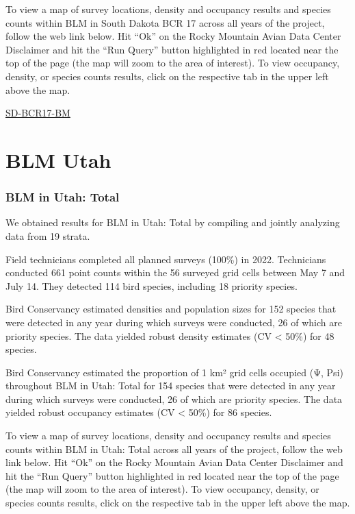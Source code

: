 \documentclass[
  letterpaper,
  DIV=11,
  numbers=noendperiod,
  oneside]{scrreprt}
\begin{document}
To view a map of survey locations, density and occupancy results and
species counts within BLM in South Dakota BCR 17 across all years of the
project, follow the web link below. Hit ``Ok'' on the Rocky Mountain
Avian Data Center Disclaimer and hit the ``Run Query'' button
highlighted in red located near the top of the page (the map will zoom
to the area of interest). To view occupancy, density, or species counts
results, click on the respective tab in the upper left above the map.

\href{http://www.rmbo.org/new_site/adc/QueryWindow.aspx\#N4IgzgLgTghhCuBbEAuABCAygEQLQCEBhAJQEYB2AgWXX3igFMZ40B7AMzQBkYA7AEzRU+MAOYNEDXhBABfIA===}{SD-BCR17-BM}

\hypertarget{blm-utah}{%
\section{BLM Utah}\label{blm-utah}}

\hypertarget{blm-in-utah-total}{%
\subsubsection{BLM in Utah: Total}\label{blm-in-utah-total}}

We obtained results for BLM in Utah: Total by compiling and jointly
analyzing data from 19 strata.

Field technicians completed all planned surveys (100\%) in 2022.
Technicians conducted 661 point counts within the 56 surveyed grid cells
between May 7 and July 14. They detected 114 bird species, including 18
priority species.

Bird Conservancy estimated densities and population sizes for 152
species that were detected in any year during which surveys were
conducted, 26 of which are priority species. The data yielded robust
density estimates (CV \textless{} 50\%) for 48 species.

Bird Conservancy estimated the proportion of 1 km² grid cells occupied
(Ψ, Psi) throughout BLM in Utah: Total for 154 species that were
detected in any year during which surveys were conducted, 26 of which
are priority species. The data yielded robust occupancy estimates (CV
\textless{} 50\%) for 86 species.

To view a map of survey locations, density and occupancy results and
species counts within BLM in Utah: Total across all years of the
project, follow the web link below. Hit ``Ok'' on the Rocky Mountain
Avian Data Center Disclaimer and hit the ``Run Query'' button
highlighted in red located near the top of the page (the map will zoom
to the area of interest). To view occupancy, density, or species counts
results, click on the respective tab in the upper left above the map.
\end{document}
